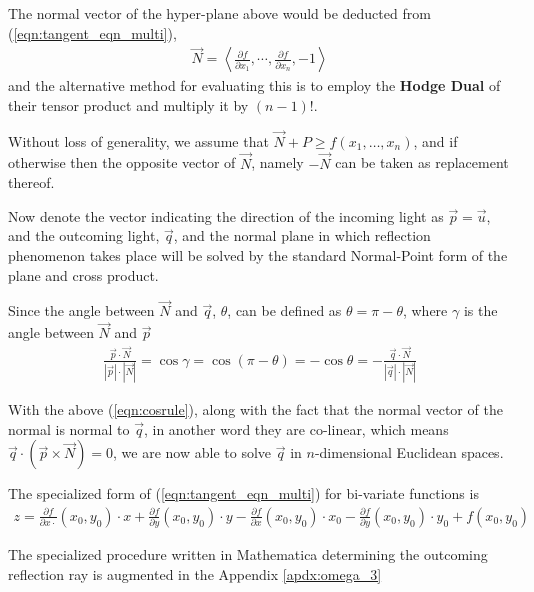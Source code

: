 \documentclass{article}
\begin{document}
The normal vector of the hyper-plane above would be deducted from (\ref{eqn:tangent_eqn_multi}),
\begin{gather}
\label{eqn:normal_at_point}
\vec{N}=\left<\frac{\partial f}{\partial x_1},\cdots,\frac{\partial f}{\partial x_n},-1\right>
\end{gather}
and the alternative method for evaluating this is to employ the \textbf{Hodge Dual} of their tensor product and multiply it by $(n-1)!$.

Without loss of generality, we assume that $\vec{N}+P\geq f\left(x_1,\dots,x_n\right)$, and if otherwise then the opposite vector of $\vec{N}$, namely $-\vec{N}$ can be taken as replacement thereof.

Now denote the vector indicating the direction of the incoming light as $\vec{p}=\vec{u}$, and the outcoming light, $\vec{q}$, and the normal plane in which reflection phenomenon takes place will be solved by the standard Normal-Point form of the plane and cross product.

Since the angle between $\vec{N}$ and $\vec{q}$, $\theta$, can be defined as $\theta=\pi-\theta$, where $\gamma$ is the angle between $\vec{N}$ and $\vec{p}$
\begin{gather}
\label{eqn:cosrule}
\frac{\vec{p}\cdot\vec{N}}{\left|\vec{p}\right|\cdot\left|\vec{N}\right|}=\cos\gamma=\cos(\pi-\theta)=-\cos\theta=-\frac{\vec{q}\cdot\vec{N}}{\left|\vec{q}\right|\cdot\left|\vec{N}\right|}
\end{gather}

With the above (\ref{eqn:cosrule}), along with the fact that the normal vector of the normal is normal to $\vec{q}$, in another word they are co-linear, which means $\vec{q}\cdot\left(\vec{p}\times\vec{N}\right)=0$, we are now able to solve $\vec{q}$ in $n$-dimensional Euclidean spaces.

The specialized form of (\ref{eqn:tangent_eqn_multi}) for bi-variate functions is
\begin{gather}
\label{eqn:tangent_eqn_bivar}
z=\frac{\partial f}{\partial x\cdot}(x_0,y_0)\cdot x+\frac{\partial f}{\partial y}(x_0,y_0)\cdot y-\frac{\partial f}{\partial x}(x_0,y_0)\cdot x_0-\frac{\partial f}{\partial y}(x_0,y_0)\cdot y_0+f(x_0,y_0)
\end{gather}

The specialized procedure written in Mathematica determining the outcoming reflection ray is augmented in the Appendix \ref{apdx:omega_3}
\end{document}

